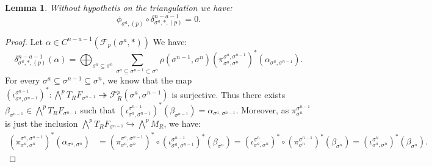 \documentclass{article}
\newtheorem{lemma}{Lemma}
\begin{document}
\begin{lemma}
    Without hypothetis on the triangulation we have:
    \begin{equation*}
        \phi_{\sigma^a,(p)} \circ \delta_{\sigma^a,*,(p)}^{n-a-1} = 0.
    \end{equation*}
\end{lemma}

\begin{proof}
    Let $\alpha \in C^{n-a-1}(\mathcal{F}_p(\sigma^a,*))$ We have:
    \begin{equation*}
        \delta_{\sigma^a,*,(p)}^{n-a-1}(\alpha)=\bigoplus_{\sigma^a \subseteq \sigma^n}\sum_{\sigma^a \subseteq \sigma^{n-1} \subset \sigma^{n}} \rho(\sigma^{n-1},\sigma^{n}) (\pi_{\sigma^{a},\sigma^{n}}^{\sigma^{a},\sigma^{n-1}})^* (\alpha_{\sigma^a,\sigma^{n-1}}).
    \end{equation*}
    For every ${\sigma^a \subseteq \sigma^{n-1}\subseteq \sigma^n}$, we know that the map $(\iota_{\sigma^a,\sigma^{n-1}}^{\sigma^{n-1}})^*: \bigwedge ^pT_RF_{\sigma^{n-1}} \twoheadrightarrow \mathcal{F}^p_R(\sigma^a,\sigma^{n-1})$ is surjective. Thus there exists $\beta_{\sigma^{n-1}} \in \bigwedge ^pT_RF_{\sigma^{n-1}} $ such that $(\iota_{\sigma^a,\sigma^{n-1}}^{\sigma^{n-1}})^*(\beta_{\sigma^{n-1}})=\alpha_{\sigma^a,\sigma^{n-1}}$. Moreover, as $\pi^{\sigma^{n-1}}_{\sigma^n}$ is just the inclusion $\bigwedge^pT_RF_{\sigma^{n-1}} \hookrightarrow \bigwedge^p M_R$, we have:
    \begin{align*}
        (\pi_{\sigma^{a},\sigma^{n}}^{\sigma^{a},\sigma^{n-1}})^*(\alpha_{\sigma^a,\sigma^n}) &= (\pi_{\sigma^{a},\sigma^{n}}^{\sigma^{a},\sigma^{n-1}})^*\circ(\iota_{\sigma^a,\sigma^{n-1}}^{\sigma^{n-1}})^*(\beta_{\sigma^n}) = (\iota_{\sigma^a,\sigma^{n}}^{\sigma^{n}})^*\circ(\pi^{\sigma^{n-1}}_{\sigma^n})^*(\beta_{\sigma^n}) = (\iota_{\sigma^a,\sigma^{n}}^{\sigma^{n}})^*(\beta_{\sigma^n}).
    \end{align*}


\end{proof}
\end{document}
